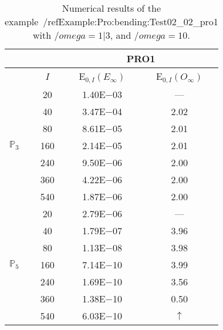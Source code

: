 \begin{table}[H]
\caption{Numerical results of the example~/ref{Example:Pro:bending:Test02_02_pro1} with $/omega=1|3$, and $/omega=10$.}
\setlength{\tabcolsep}{5pt}
\centering
\begin{tabular}{@{}l c c c@{}}
\toprule
 &  & \multicolumn{2}{c}{PRO1}\\
\midrule
 & $I$ & E$_{0,I}(E_{\infty})$ & E$_{0,I}(O_{\infty})$\\
\midrule
\multirow{7}{*}{$\mathbb{P}_{3}$}
 & 20 & 1.40E$-$03 & ---\\
 & 40 & 3.47E$-$04 & 2.02\\
 & 80 & 8.61E$-$05 & 2.01\\
 & 160 & 2.14E$-$05 & 2.01\\
 & 240 & 9.50E$-$06 & 2.00\\
 & 360 & 4.22E$-$06 & 2.00\\
 & 540 & 1.87E$-$06 & 2.00\\
\midrule
\multirow{7}{*}{$\mathbb{P}_{5}$}
 & 20 & 2.79E$-$06 & ---\\
 & 40 & 1.79E$-$07 & 3.96\\
 & 80 & 1.13E$-$08 & 3.98\\
 & 160 & 7.14E$-$10 & 3.99\\
 & 240 & 1.69E$-$10 & 3.56\\
 & 360 & 1.38E$-$10 & 0.50\\
 & 540 & 6.03E$-$10 & $\uparrow$\\
\bottomrule
\end{tabular}
\label{Table:PRO:test_02_02_test8_pro1}
\end{table}
